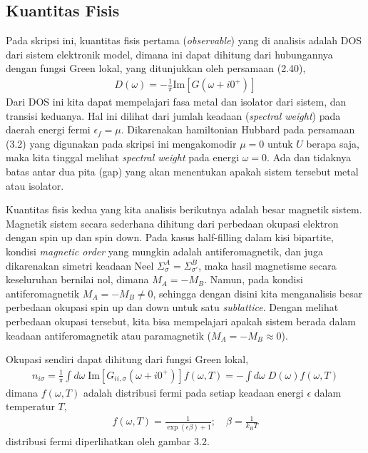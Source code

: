 \subsection{Kuantitas Fisis}

Pada skripsi ini, kuantitas fisis pertama (\textit{observable}) yang di analisis adalah DOS dari sistem elektronik model, dimana ini dapat dihitung dari hubungannya dengan fungsi Green lokal, yang ditunjukkan oleh persamaan (2.40),
\begin{align}
D(\omega) = - \frac{1}{\pi} \text{Im} [G(\omega + i0^+)]
\end{align}
Dari DOS ini kita dapat mempelajari fasa metal dan isolator dari sistem, dan transisi keduanya. Hal ini dilihat dari jumlah keadaan (\textit{spectral weight}) pada daerah energi fermi $\epsilon_f = \mu$. Dikarenakan hamiltonian Hubbard pada persamaan (3.2) yang digunakan pada skripsi ini mengakomodir $\mu =0$ untuk $U$ berapa saja, maka kita tinggal melihat \textit{spectral weight} pada energi $\omega = 0$. Ada dan tidaknya batas antar dua pita (gap) yang akan menentukan apakah sistem tersebut metal atau isolator.

Kuantitas fisis kedua yang kita analisis berikutnya adalah besar magnetik sistem. Magnetik sistem secara sederhana dihitung dari perbedaan okupasi elektron dengan spin up dan spin down. Pada kasus half-filling dalam kisi bipartite, kondisi \textit{magnetic order} yang mungkin adalah antiferomagnetik, dan juga dikarenakan simetri keadaan Neel $\Sigma^A_\sigma = \Sigma^B_{\sigma'}$, maka hasil magnetisme secara keseluruhan bernilai nol, dimana $M_A = - M_B$. Namun, pada kondisi antiferomagnetik $M_A = - M_B \neq 0$, sehingga dengan disini kita menganalisis besar perbedaan okupasi spin up dan down untuk satu \textit{sublattice}. Dengan melihat perbedaan okupasi tersebut, kita bisa mempelajari apakah sistem berada dalam keadaan antiferomagnetik atau paramagnetik ($M_A = - M_B \approx 0$). 

Okupasi sendiri dapat dihitung dari fungsi Green lokal,
\begin{align}
n_{i\sigma} = \frac{1}{\pi} \int d\omega \;  \text{Im} [G_{ii,\sigma}(\omega + i0^+)] f(\omega,T) = - \int d\omega\; D(\omega) f(\omega,T)
\end{align}
dimana $f(\omega,T)$ adalah distribusi fermi pada setiap keadaan energi $\epsilon$ dalam temperatur $T$,
\begin{align}
f(\omega,T) = \frac{1}{\exp(\epsilon\beta) + 1}; \quad \beta = \frac{1}{k_BT}
\end{align}
distribusi fermi diperlihatkan oleh gambar 3.2.

